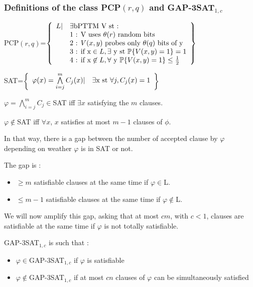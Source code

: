 \subsubsection{Definitions of the class PCP$(r,q)$ and GAP-3SAT$_{1,c}$}
\begin{definition}
PCP$(r,q)$=$\left\{
\begin{array}{r l}
L| & \exists\text{bPTTM V  st :}\\
 & \text{1 : V uses }\theta(r)\text{ random bits}\\
 & \text{2 : }V(x,y)\text{ probes only }\theta(q)\text{ bits of y}\\
 & \text{3 : if x}\in L,\exists \text{ y st }\mathbb{P}\{V(x,y)=1\}=1\\
 & \text{4 : if x}\not\in L,\forall \text{ y }\mathbb{P}\{V(x,y)=1\}\le\frac{1}{2}\\
\end{array}
\right\}$
\end{definition}

\begin{definition}
SAT=$\left\{
\begin{array}{r l}
\varphi(x)=\bigwedge\limits_{i=j}^mC_j(x)| & \exists \text{x st }\forall j,C_j(x)=1\\
\end{array}
\right\}$

$\varphi=\bigwedge\limits_{i=j}^mC_j\in$SAT iff $\exists x$ satisfying the $m$ clauses.

$\varphi\not\in$SAT iff $\forall x$, $x$ satisfies at most $m-1$ clauses of $\phi$.
\end{definition}

In that way, there is a gap between the number of accepted clause by $\varphi$ depending on weather $\varphi$ is in SAT or not.

The gap is :
\begin{itemize}
\item $\ge m$ satisfiable clauses at the same time if $\varphi\in$L.
\item $\le m-1$ satisfiable clauses at the same time if $\varphi\not\in$L.
\end{itemize}

We will now amplify this gap, asking that at most $cm$, with $c<1$, clauses are satisfiable at the same time if $\varphi$ is not totally satisfiable.

\begin{definition}
GAP-3SAT$_{1,c}$ is such that :
\begin{itemize}
\item $\varphi\in$GAP-3SAT$_{1,c}$ if $\varphi$ is satisfiable
\item $\varphi\not\in$GAP-3SAT$_{1,c}$ if at most $cn$ clauses of $\varphi$ can be simultaneously satisfied
\end{itemize}
\end{definition}

